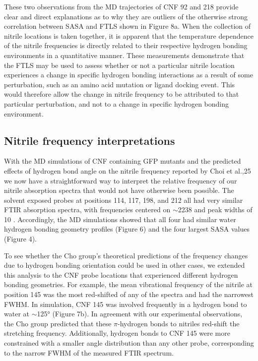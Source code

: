 These two observations from the MD trajectories of CNF 92 and 218 provide clear and direct explanations as to why they are outliers of the otherwise strong correlation between SASA and FTLS shown in Figure 8a.
When the collection of nitrile locations is taken together, it is apparent that the temperature dependence of the nitrile frequencies is directly related to their respective hydrogen bonding environments in a quantitative manner.
These measurements demonstrate that the FTLS may be used to assess whether or not a particular nitrile location experiences a change in specific hydrogen bonding interactions as a result of some perturbation, such as an amino acid mutation or ligand docking event.
This would therefore allow the change in nitrile frequency to be attributed to that particular perturbation, and not to a change in specific hydrogen bonding environment.

\subsection{Nitrile frequency interpretations}

With the MD simulations of CNF containing GFP mutants and the predicted effects of hydrogen bond angle on the nitrile frequency reported by Choi et al.,25 we now have a straightforward way to interpret the relative frequency of our nitrile absorption spectra that would not have otherwise been possible.
The solvent exposed probes at positions 114, 117, 198, and 212 all had very similar FTIR absorption spectra, with frequencies centered on $\sim$2238 \si{\wn} and peak widths of 10 \si{\wn}.
Accordingly, the MD simulations showed that all four had similar water hydrogen bonding geometry profiles (Figure 6) and the four largest SASA values (Figure 4).

To see whether the Cho group's theoretical predictions of the frequency changes due to hydrogen bonding orientation could be used in other cases, we extended this analysis to the CNF probe locations that experienced different hydrogen bonding geometries.
For example, the mean vibrational frequency of the nitrile at position 145 was the most red-shifted of any of the spectra and had the narrowest FWHM.
In simulation, CNF 145 was involved frequently in a hydrogen bond to water at $\sim$\ang{125} (Figure 7b).
In agreement with our experimental observations, the Cho group predicted that these $\pi$-hydrogen bonds to nitriles red-shift the stretching frequency.
Additionally, hydrogen bonds to CNF 145 were more constrained with a smaller angle distribution than any other probe, corresponding to the narrow FWHM of the measured FTIR spectrum. 

